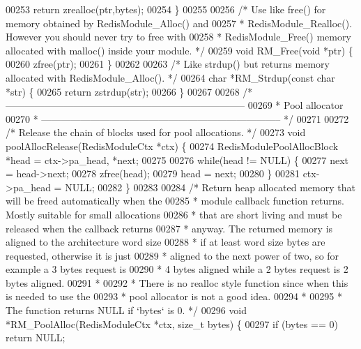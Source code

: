 \begin{DoxyCode}
00253     \textcolor{keywordflow}{return} zrealloc(ptr,bytes);
00254 \}
00255 
00256 \textcolor{comment}{/* Use like free() for memory obtained by RedisModule\_Alloc() and}
00257 \textcolor{comment}{ * RedisModule\_Realloc(). However you should never try to free with}
00258 \textcolor{comment}{ * RedisModule\_Free() memory allocated with malloc() inside your module. */}
00259 \textcolor{keywordtype}{void} RM\_Free(\textcolor{keywordtype}{void} *ptr) \{
00260     zfree(ptr);
00261 \}
00262 
00263 \textcolor{comment}{/* Like strdup() but returns memory allocated with RedisModule\_Alloc(). */}
00264 \textcolor{keywordtype}{char} *RM\_Strdup(\textcolor{keyword}{const} \textcolor{keywordtype}{char} *str) \{
00265     \textcolor{keywordflow}{return} zstrdup(str);
00266 \}
00267 
00268 \textcolor{comment}{/* --------------------------------------------------------------------------}
00269 \textcolor{comment}{ * Pool allocator}
00270 \textcolor{comment}{ * -------------------------------------------------------------------------- */}
00271 
00272 \textcolor{comment}{/* Release the chain of blocks used for pool allocations. */}
00273 \textcolor{keywordtype}{void} poolAllocRelease(RedisModuleCtx *ctx) \{
00274     RedisModulePoolAllocBlock *head = ctx->pa\_head, *next;
00275 
00276     \textcolor{keywordflow}{while}(head != NULL) \{
00277         next = head->next;
00278         zfree(head);
00279         head = next;
00280     \}
00281     ctx->pa\_head = NULL;
00282 \}
00283 
00284 \textcolor{comment}{/* Return heap allocated memory that will be freed automatically when the}
00285 \textcolor{comment}{ * module callback function returns. Mostly suitable for small allocations}
00286 \textcolor{comment}{ * that are short living and must be released when the callback returns}
00287 \textcolor{comment}{ * anyway. The returned memory is aligned to the architecture word size}
00288 \textcolor{comment}{ * if at least word size bytes are requested, otherwise it is just}
00289 \textcolor{comment}{ * aligned to the next power of two, so for example a 3 bytes request is}
00290 \textcolor{comment}{ * 4 bytes aligned while a 2 bytes request is 2 bytes aligned.}
00291 \textcolor{comment}{ *}
00292 \textcolor{comment}{ * There is no realloc style function since when this is needed to use the}
00293 \textcolor{comment}{ * pool allocator is not a good idea.}
00294 \textcolor{comment}{ *}
00295 \textcolor{comment}{ * The function returns NULL if `bytes` is 0. */}
00296 \textcolor{keywordtype}{void} *RM\_PoolAlloc(RedisModuleCtx *ctx, size\_t bytes) \{
00297     \textcolor{keywordflow}{if} (bytes == 0) \textcolor{keywordflow}{return} NULL;

\end{DoxyCode}
